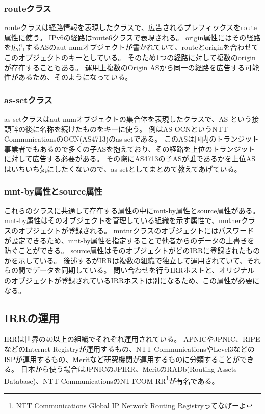 \subsubsection{routeクラス}
routeクラスは経路情報を表現したクラスで、広告されるプレフィックスをroute属性に使う。
IPv6の経路はroute6クラスで表現される。
origin属性にはその経路を広告するASのaut-numオブジェクトが書かれていて、routeとoriginを合わせてこのオブジェクトのキーとしている。
そのため1つの経路に対して複数のoriginが存在することもある。
運用上複数のOrigin ASから同一の経路を広告する可能性があるため、そのようになっている。

\subsubsection{as-setクラス}
as-setクラスはaut-numオブジェクトの集合体を表現したクラスで、AS-という接頭辞の後に名称を続けたものをキーに使う。
例はAS-OCNというNTT CommunicationsのOCN(AS4713)のas-setである。
このASは国内のトランジット事業者でもあるので多くの子ASを抱えており、その経路を上位のトランジットに対して広告する必要がある。
その際にAS4713の子ASが誰であるかを上位ASはいちいち気にしたくないので、as-setとしてまとめて教えてあげている。

\subsubsection{mnt-by属性とsource属性}
これらのクラスに共通して存在する属性の中にmnt-by属性とsource属性がある。
mnt-by属性はそのオブジェクトを管理している組織を示す属性で、mntnerクラスのオブジェクトが登録される。
mntnrクラスのオブジェクトにはパスワードが設定できるため、mnt-by属性を指定することで他者からのデータの上書きを防ぐことができる。
source属性はそのオブジェクトがどのIRRに登録されたものかを示している。
後述するがIRRは複数の組織で独立して運用されていて、それらの間でデータを同期している。
問い合わせを行うIRRホストと、オリジナルのオブジェクトが登録されているIRRホストは別になるため、この属性が必要になる。

\subsection{IRRの運用}

IRRは世界の40以上の組織でそれぞれ運用されている。
APNICやJPNIC、RIPEなどのInternet Registryが運用するもの、NTT CommunicationsやLevel3などのISPが運用するもの、Meritなど研究機関が運用するものに分類することができる。
日本から使う場合はJPNICのJPIRR、MeritのRADb(Routing Assets Database)、NTT CommunicationsのNTTCOM RR\footnote{NTT Communications Global IP Network Routing Registryってなげーよ}が有名である。

